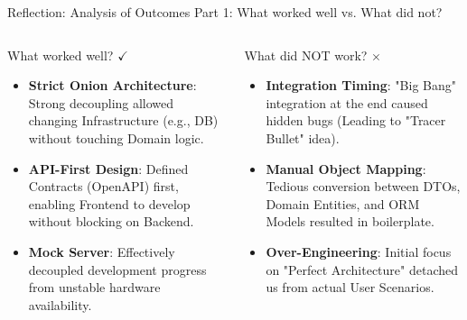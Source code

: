 \documentclass[aspectratio=169, 10pt, xcolor=table]{beamer}
\begin{document}
\begin{frame}{Reflection: Analysis of Outcomes}
    {Part 1: What worked well vs. What did not?}
    \footnotesize
    \begin{columns}[t]
            \begin{block}{What worked well? $\checkmark$}
                \pause
                \begin{itemize}[<+->]
                    \setlength\itemsep{0.5em}
                    \item \textbf{Strict Onion Architecture}: Strong decoupling allowed changing Infrastructure (e.g., DB) without touching Domain logic.
                    \item \textbf{API-First Design}: Defined Contracts (OpenAPI) first, enabling Frontend to develop without blocking on Backend.
                    \item \textbf{Mock Server}: Effectively decoupled development progress from unstable hardware availability.
                \end{itemize}
            \end{block}

            \begin{block}{What did NOT work? $\times$}
                \pause
                \begin{itemize}[<+->]
                    \setlength\itemsep{0.5em}
                    \item \textbf{Integration Timing}: "Big Bang" integration at the end caused hidden bugs (Leading to "Tracer Bullet" idea).
                    \item \textbf{Manual Object Mapping}: Tedious conversion between DTOs, Domain Entities, and ORM Models resulted in boilerplate.
                    \item \textbf{Over-Engineering}: Initial focus on "Perfect Architecture" detached us from actual User Scenarios.
                \end{itemize}
            \end{block}
    \end{columns}
\end{frame}
\end{document}
